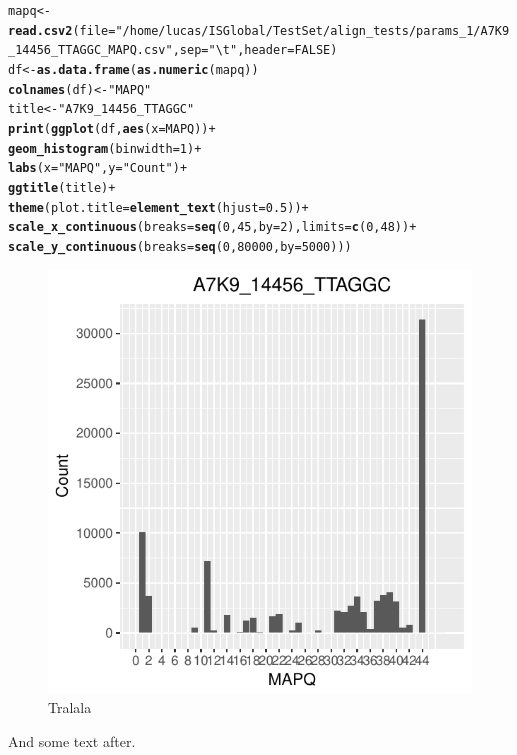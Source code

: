 \documentclass[12pt, a4paper]{article}\usepackage[]{graphicx}\usepackage[]{color}
\makeatletter
\def\maxwidth{ %
  \ifdim\Gin@nat@width>\linewidth
    \linewidth
  \else
    \Gin@nat@width
  \fi
}
\newcommand{\hlnum}[1]{\textcolor[rgb]{0.686,0.059,0.569}{#1}}%
\newcommand{\hlstr}[1]{\textcolor[rgb]{0.192,0.494,0.8}{#1}}%
\newcommand{\hlopt}[1]{\textcolor[rgb]{0,0,0}{#1}}%
\newcommand{\hlstd}[1]{\textcolor[rgb]{0.345,0.345,0.345}{#1}}%
\newcommand{\hlkwb}[1]{\textcolor[rgb]{0.69,0.353,0.396}{#1}}%
\newcommand{\hlkwc}[1]{\textcolor[rgb]{0.333,0.667,0.333}{#1}}%
\newcommand{\hlkwd}[1]{\textcolor[rgb]{0.737,0.353,0.396}{\textbf{#1}}}%
\newenvironment{kframe}{%
 \def\at@end@of@kframe{}%
 \ifinner\ifhmode%
  \def\at@end@of@kframe{\end{minipage}}%
  \begin{minipage}{\columnwidth}%
 \fi\fi%
 \def\FrameCommand##1{\hskip\@totalleftmargin \hskip-\fboxsep
 \colorbox{shadecolor}{##1}\hskip-\fboxsep
     \hskip-\linewidth \hskip-\@totalleftmargin \hskip\columnwidth}%
 \MakeFramed {\advance\hsize-\width
   \@totalleftmargin\z@ \linewidth\hsize
   \@setminipage}}%
 {\par\unskip\endMakeFramed%
 \at@end@of@kframe}
\newenvironment{knitrout}{}{} %
\makeatother
\begin{document}
\begin{knitrout}
\color{fgcolor}\begin{kframe}
\begin{alltt}
\hlstd{mapq} \hlkwb{<-} \hlkwd{read.csv2}\hlstd{(}\hlkwc{file} \hlstd{=} \hlstr{"/home/lucas/ISGlobal/TestSet/align_tests/params_1/A7K9_14456_TTAGGC_MAPQ.csv"}\hlstd{,} \hlkwc{sep} \hlstd{=} \hlstr{"\textbackslash{}t"}\hlstd{,} \hlkwc{header} \hlstd{=} \hlnum{FALSE}\hlstd{)}
\hlstd{df} \hlkwb{<-} \hlkwd{as.data.frame}\hlstd{(}\hlkwd{as.numeric}\hlstd{(mapq))}
\hlkwd{colnames}\hlstd{(df)} \hlkwb{<-} \hlstr{"MAPQ"}
\hlstd{title} \hlkwb{<-} \hlstr{"A7K9_14456_TTAGGC"}
\hlkwd{print}\hlstd{(}\hlkwd{ggplot}\hlstd{(df,} \hlkwd{aes}\hlstd{(}\hlkwc{x} \hlstd{= MAPQ))} \hlopt{+}
        \hlkwd{geom_histogram}\hlstd{(}\hlkwc{binwidth} \hlstd{=} \hlnum{1}\hlstd{)} \hlopt{+}
        \hlkwd{labs}\hlstd{(}\hlkwc{x} \hlstd{=} \hlstr{"MAPQ"}\hlstd{,} \hlkwc{y} \hlstd{=} \hlstr{"Count"}\hlstd{)} \hlopt{+}
        \hlkwd{ggtitle}\hlstd{(title)} \hlopt{+}
        \hlkwd{theme}\hlstd{(}\hlkwc{plot.title} \hlstd{=} \hlkwd{element_text}\hlstd{(}\hlkwc{hjust} \hlstd{=} \hlnum{0.5}\hlstd{))} \hlopt{+}
        \hlkwd{scale_x_continuous}\hlstd{(}\hlkwc{breaks} \hlstd{=} \hlkwd{seq}\hlstd{(}\hlnum{0}\hlstd{,} \hlnum{45}\hlstd{,} \hlkwc{by} \hlstd{=} \hlnum{2}\hlstd{),} \hlkwc{limits} \hlstd{=} \hlkwd{c}\hlstd{(}\hlnum{0}\hlstd{,}\hlnum{48}\hlstd{))} \hlopt{+}
        \hlkwd{scale_y_continuous}\hlstd{(}\hlkwc{breaks} \hlstd{=} \hlkwd{seq}\hlstd{(}\hlnum{0}\hlstd{,}\hlnum{80000}\hlstd{,} \hlkwc{by} \hlstd{=} \hlnum{5000}\hlstd{)))}
\end{alltt}
\end{kframe}\begin{figure}[h]
\includegraphics[width=\maxwidth]{figure/p3-1} \caption[Tralala]{Tralala}\label{fig:p3}
\end{figure}


\end{knitrout}


And some text after.
\end{document}
